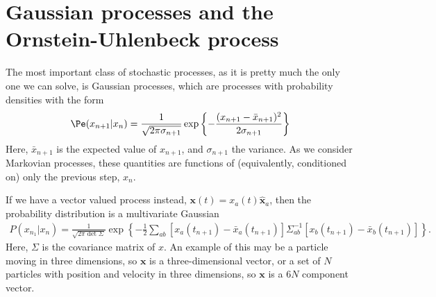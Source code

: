 \section{Gaussian processes and the Ornstein-Uhlenbeck process}

The most important class of stochastic processes, as it is pretty much the only one we can solve, is Gaussian processes, which are processes with probability densities with the form
%
\begin{align}
    \Pe(x_{n+1}|x_n)
    =
    \frac{ 1 }{ \sqrt{ 2 \pi \sigma_{n+1} } }
    \exp \left\{ {-\frac{(x_{n+1} - \bar x_{n + 1})^2}{2 \sigma_{n+1} }} \right\}
\end{align}
%
Here, $\bar x_{n+1}$ is the expected value of $x_{n+1}$, and $\sigma_{n+1}$ the variance.
As we consider Markovian processes, these quantities are functions of (equivalently, conditioned on) only the previous step, $x_n$.


If we have a vector valued process instead, $\bm x(t) = x_a(t) \hat {\bm x}_a$, then the probability distribution is a multivariate Gaussian
%
\begin{align}
    P(x_{n_1}|x_n)
    = 
    \frac{ 1 }{ \sqrt{ 2 \pi \det \Sigma } }
    \exp \left\{ - \frac{1}{2}\sum_{ab} \left[x_a(t_{n+1}) - \bar x_a(t_{n+1})\right] \Sigma_{ab}^{-1} \left[x_b(t_{n+1}) - \bar x_b(t_{n+1})\right] \right\}.
\end{align}
%
Here, $\Sigma$ is the covariance matrix of $x$.
An example of this may be a particle moving in three dimensions, so $\bm x$ is a three-dimensional vector, or a set of $N$ particles with position and velocity in three dimensions, so $\bm x$ is a $6 N$ component vector.


